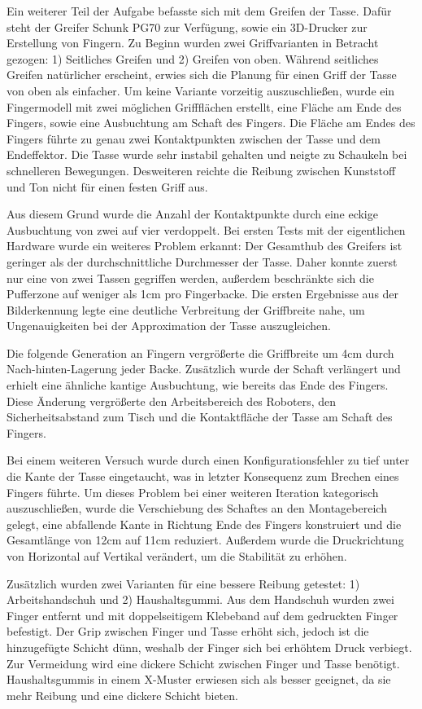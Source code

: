 Ein weiterer Teil der Aufgabe befasste sich mit dem Greifen der Tasse. Dafür steht der Greifer Schunk PG70 zur Verfügung, sowie ein 3D-Drucker zur Erstellung von Fingern. Zu Beginn wurden zwei Griffvarianten in Betracht gezogen: 1) Seitliches Greifen und 2) Greifen von oben. Während seitliches Greifen natürlicher erscheint, erwies sich die Planung für einen Griff der Tasse von oben als einfacher. Um keine Variante vorzeitig auszuschließen, wurde ein Fingermodell mit zwei möglichen Griffflächen erstellt, eine Fläche am Ende des Fingers, sowie eine Ausbuchtung am Schaft des Fingers. Die Fläche am Endes des Fingers führte zu genau zwei Kontaktpunkten zwischen der Tasse und dem Endeffektor. Die Tasse wurde sehr instabil gehalten und neigte zu Schaukeln bei schnelleren Bewegungen. Desweiteren reichte die Reibung zwischen Kunststoff und Ton nicht für einen festen Griff aus.

Aus diesem Grund wurde die Anzahl der Kontaktpunkte durch eine eckige Ausbuchtung von zwei auf vier verdoppelt. Bei ersten Tests mit der eigentlichen Hardware wurde ein weiteres Problem erkannt: Der Gesamthub des Greifers ist geringer als der durchschnittliche Durchmesser der Tasse. Daher konnte zuerst nur eine von zwei Tassen gegriffen werden, außerdem beschränkte sich die Pufferzone auf weniger als 1cm pro Fingerbacke. Die ersten Ergebnisse aus der Bilderkennung legte eine deutliche Verbreitung der Griffbreite nahe, um Ungenauigkeiten bei der Approximation der Tasse auszugleichen.

Die folgende Generation an Fingern vergrößerte die Griffbreite um 4cm durch \glqq Nach-hinten\grqq -Lagerung jeder Backe. Zusätzlich wurde der Schaft verlängert und erhielt eine ähnliche kantige Ausbuchtung, wie bereits das Ende des Fingers. Diese Änderung vergrößerte den Arbeitsbereich des Roboters, den Sicherheitsabstand zum Tisch und die Kontaktfläche der Tasse am Schaft des Fingers.

Bei einem weiteren Versuch wurde durch einen Konfigurationsfehler zu tief unter die Kante der Tasse eingetaucht, was in letzter Konsequenz zum Brechen eines Fingers führte. Um dieses Problem bei einer weiteren Iteration kategorisch auszuschließen, wurde die Verschiebung des Schaftes an den Montagebereich gelegt, eine abfallende Kante in Richtung Ende des Fingers konstruiert und die Gesamtlänge von 12cm auf 11cm reduziert. Außerdem wurde die Druckrichtung von Horizontal auf Vertikal verändert, um die Stabilität zu erhöhen.

Zusätzlich wurden zwei Varianten für eine bessere Reibung getestet: 1) Arbeitshandschuh und 2) Haushaltsgummi. Aus dem Handschuh wurden zwei Finger entfernt und mit doppelseitigem Klebeband auf dem gedruckten Finger befestigt. Der Grip zwischen Finger und Tasse erhöht sich, jedoch ist die hinzugefügte Schicht dünn, weshalb der Finger sich bei erhöhtem Druck verbiegt. Zur Vermeidung wird eine dickere Schicht zwischen Finger und Tasse benötigt. Haushaltsgummis in einem X-Muster erwiesen sich als besser geeignet, da sie mehr Reibung und eine dickere Schicht bieten.

